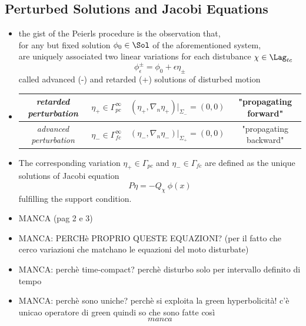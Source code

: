 \documentclass[a4paper,11pt]{scrartcl}
\begin{document}
	\subsection{Perturbed Solutions and Jacobi Equations}
	\begin{itemize}
		\item the gist of the Peierls procedure is the observation that, \\
		for any but fixed  solution $\phi_0\in\Sol$ of the aforementioned system,\\
		are uniquely associated two linear variations for each distubance $\chi \in \Lag_{tc}$
		$$ \phi^\pm_\epsilon = \phi_0 + \epsilon \eta_\pm $$
		called advanced (-) and retarded (+)  solutions of disturbed motion \\
		\item
		\begin{tabular}{|c|c|c|c|}
   			\hline
  	 		\emph{retarded perturbation} & $\eta_+ \in \Gamma^\infty_{pc}$ & $(\eta_+, \nabla_n \eta_+ ) \big \vert_{\Sigma_{-}} = (0,0)$ & "propagating forward" \\
  	 		\hline
   			\emph{advanced perturbation} &$\eta_- \in \Gamma^\infty_{fc}$ & $(\eta_-, \nabla_n \eta_- ) \big \vert_{\Sigma_{+}} = (0,0)$ & "propagating backward" \\
   			\hline
   		\end{tabular}
   		\item The corresponding variation $\eta_+ \in \Gamma_{pc}$ and $\eta_- \in \Gamma_{fc}$ are defined as the unique solutions of Jacobi equation
   		$$ P \eta = -Q_\chi \: \phi(x) $$
   		fulfilling the support condition.
   		\item MANCA (pag 2 e 3)
   		\item MANCA: PERCHè PROPRIO QUESTE EQUAZIONI? (per il fatto che cerco variazioni che matchano le equazioni del moto disturbate)
   		\item MANCA: perchè time-compact? perchè disturbo solo per intervallo definito di tempo
   		\item MANCA: perchè sono uniche? perchè si exploita la green hyperbolicità! c'è unicao operatore di green quindi so che sono fatte così $$ manca$$
		
	\end{itemize}
\end{document}

